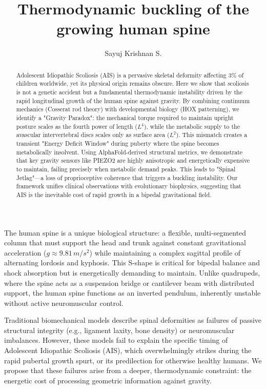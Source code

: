 \documentclass[12pt]{article}
\title{Thermodynamic buckling of the growing human spine}
\author[1]{Sayuj Krishnan S.}
\affil[1]{Yashoda Hospitals, Malakpet, Hyderabad, India. dr.sayujkrishnan@gmail.com}
\date{}
\begin{document}
\maketitle
\linenumbers

\begin{abstract}
Adolescent Idiopathic Scoliosis (AIS) is a pervasive skeletal deformity affecting 3\% of children worldwide, yet its physical origin remains obscure. Here we show that scoliosis is not a genetic accident but a fundamental thermodynamic instability driven by the rapid longitudinal growth of the human spine against gravity. By combining continuum mechanics (Cosserat rod theory) with developmental biology (HOX patterning), we identify a "Gravity Paradox": the mechanical torque required to maintain upright posture scales as the fourth power of length ($L^4$), while the metabolic supply to the avascular intervertebral discs scales only as surface area ($L^2$). This mismatch creates a transient "Energy Deficit Window" during puberty where the spine becomes metabolically insolvent. Using AlphaFold-derived structural metrics, we demonstrate that key gravity sensors like PIEZO2 are highly anisotropic and energetically expensive to maintain, failing precisely when metabolic demand peaks. This leads to "Spinal Jetlag"---a loss of proprioceptive coherence that triggers a buckling instability. Our framework unifies clinical observations with evolutionary biophysics, suggesting that AIS is the inevitable cost of rapid growth in a bipedal gravitational field.
\end{abstract}

The human spine is a unique biological structure: a flexible, multi-segmented column that must support the head and trunk against constant gravitational acceleration ($g \approx 9.81 \, m/s^2$) while maintaining a complex sagittal profile of alternating lordosis and kyphosis. This S-shape is critical for bipedal balance and shock absorption but is energetically demanding to maintain. Unlike quadrupeds, where the spine acts as a suspension bridge or cantilever beam with distributed support, the human spine functions as an inverted pendulum, inherently unstable without active neuromuscular control.

Traditional biomechanical models describe spinal deformities as failures of passive structural integrity (e.g., ligament laxity, bone density) or neuromuscular imbalances. However, these models fail to explain the specific timing of Adolescent Idiopathic Scoliosis (AIS), which overwhelmingly strikes during the rapid pubertal growth spurt, or its predilection for otherwise healthy humans. We propose that these failures arise from a deeper, thermodynamic constraint: the energetic cost of processing geometric information against gravity.
\end{document}
